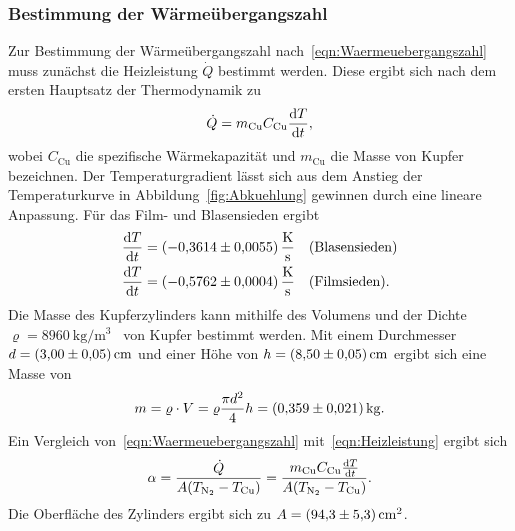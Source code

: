 \documentclass[parskip=half, a4paper,twoside,final]{article}
\begin{document}
\subsubsection{Bestimmung der Wärmeübergangszahl}

Zur Bestimmung der Wärmeübergangszahl nach~\eqref{eqn:Waermeuebergangszahl} muss zunächst die Heizleistung $\dot{Q}$ bestimmt werden. Diese ergibt sich nach dem ersten Hauptsatz der Thermodynamik zu
\begin{align}\label{eqn:Heizleistung}
  \dot{Q} = m_\text{Cu} C_\text{Cu} \dv{T}{t},
\end{align}
wobei $C_\text{Cu}$ die spezifische Wärmekapazität und $m_\text{Cu}$ die Masse von Kupfer bezeichnen. Der Temperaturgradient lässt sich aus dem Anstieg der Temperaturkurve in Abbildung~\ref{fig:Abkuehlung} gewinnen durch eine lineare Anpassung. Für das Film- und Blasensieden ergibt
\begin{align}
  \dv{T}{t} &= \SI{-0.3614\pm 0.0055}{\kelvin\per\second} \quad (\text{Blasensieden})\\
  \dv{T}{t} &= \SI{-0.5762\pm 0.0004}{\kelvin\per\second} \quad (\text{Filmsieden}).
\end{align}
Die Masse des Kupferzylinders kann mithilfe des Volumens und der Dichte $\varrho = \SI[per-mode=symbol]{8960}{\kilo\gram\per\metre\cubed}$~\cite{Fastowski} von Kupfer bestimmt werden. Mit einem Durchmesser $d = \SI{3 \pm 0.05}{\centi\metre}$ und einer Höhe von $h=\SI{8.5\pm 0.05}{\centi\metre}$ ergibt sich eine Masse von
\begin{align}
  m = \varrho \cdot V = \varrho \frac{\pi d^2}{4}h = \SI{0.359\pm 0.021}{\kilo\gram}.
\end{align}
Ein Vergleich von~\eqref{eqn:Waermeuebergangszahl} mit~\eqref{eqn:Heizleistung} ergibt sich
\begin{align}\label{eqn:alpha}
  \alpha = \frac{\dot{Q}}{A (T_\text{\ce{N2}}-T_\text{Cu})} = \frac{m_\text{Cu} C_\text{Cu} \dv{T}{t}}{A (T_\text{\ce{N2}}-T_\text{Cu})}.
\end{align}
Die Oberfläche des Zylinders ergibt sich zu $A = \SI{94.3\pm5.3}{\centi\metre\squared}$.
\end{document}
